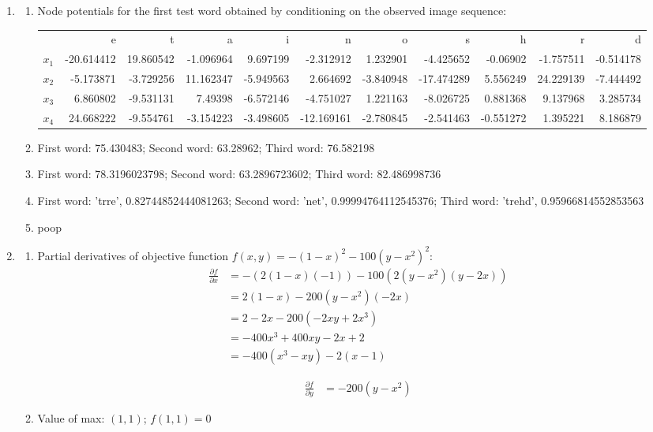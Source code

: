 \documentclass[12pt]{article}
\begin{document}
\begin{enumerate}

\item %
\begin{enumerate}
\item %
Node potentials for the first test word obtained by conditioning on the observed image sequence:
\begin{center}
\begin{tabular}{rrrrrrrrrrr}
 & e & t & a & i & n & o & s & h & r & d \\
$x_1$ & -20.614412 & 19.860542 & -1.096964 & 9.697199 & -2.312912 & 1.232901 & -4.425652 & -0.06902 & -1.757511 & -0.514178 \\
$x_2$ & -5.173871 & -3.729256 & 11.162347 & -5.949563 & 2.664692 & -3.840948 & -17.474289 & 5.556249 & 24.229139 & -7.444492 \\
$x_3$ & 6.860802 & -9.531131 & 7.49398 & -6.572146 & -4.751027 & 1.221163 & -8.026725 & 0.881368 & 9.137968 & 3.285734 \\
$x_4$ & 24.668222 & -9.554761 & -3.154223 & -3.498605 & -12.169161 & -2.780845 & -2.541463 & -0.551272 & 1.395221 & 8.186879
\end{tabular}
\end{center}

\item %
First word: 75.430483; Second word: 63.28962; Third word: 76.582198

\item %
First word: 78.3196023798; Second word: 63.2896723602; Third word: 82.486998736

\item %
First word: 'trre', 0.82744852444081263; Second word: 'net', 0.99994764112545376; Third word: 'trehd', 0.95966814552853563

\item %
poop
\end{enumerate}

\item %
\begin{enumerate}
\item Partial derivatives of objective function $f(x,y) = -(1-x)^2-100(y-x^2)^2$:
\begin{align*}
\frac{\partial f}{\partial x} &= -(2(1-x)(-1))-100(2(y-x^2)(y-2x))\\
&= 2(1-x)-200(y-x^2)(-2x)\\
&= 2-2x-200(-2xy+2x^3)\\
&= -400x^3+400xy-2x+2\\
&= -400(x^3-xy)-2(x-1)
\end{align*}

\begin{align*}
\frac{\partial f}{\partial y} &= -200(y-x^2)
\end{align*}

\item Value of max: $(1, 1)$; $f(1,1) = 0$
\end{enumerate}

\end{enumerate}
\end{document}
